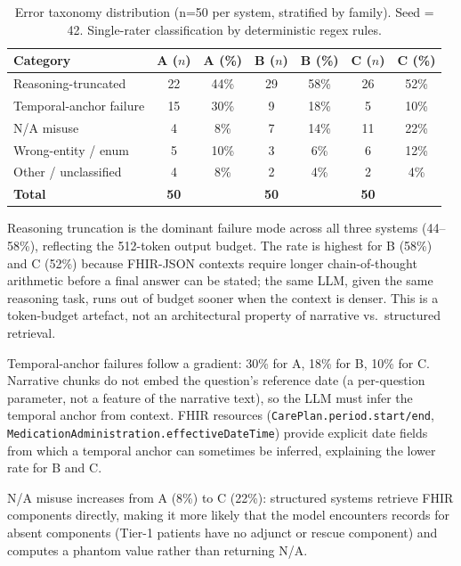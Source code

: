 \begin{table}[!htbp]
\centering
\caption{Error taxonomy distribution (n=50 per system, stratified by family).
Seed = 42. Single-rater classification by deterministic regex rules.}
\label{tab:errors}
\begin{tabular}{lcccccc}
\toprule
Category & A ($n$) & A (\%) & B ($n$) & B (\%) & C ($n$) & C (\%) \\
\midrule
Reasoning-truncated       & 22 & 44\% & 29 & 58\% & 26 & 52\% \\
Temporal-anchor failure   & 15 & 30\% & 9  & 18\% & 5  & 10\% \\
N/A misuse                & 4  & 8\%  & 7  & 14\% & 11 & 22\% \\
Wrong-entity / enum       & 5  & 10\% & 3  & 6\%  & 6  & 12\% \\
Other / unclassified      & 4  & 8\%  & 2  & 4\%  & 2  & 4\%  \\
\midrule
\textbf{Total}            & \textbf{50} & & \textbf{50} & & \textbf{50} & \\
\bottomrule
\end{tabular}
\end{table}

Reasoning truncation is the dominant failure mode across all three systems (44--58\%),
reflecting the 512-token output budget.  The rate is highest for B (58\%) and C (52\%)
because FHIR-JSON contexts require longer chain-of-thought arithmetic before a final answer
can be stated; the same LLM, given the same reasoning task, runs out of budget sooner when
the context is denser.  This is a token-budget artefact, not an architectural property of
narrative vs.\ structured retrieval.

Temporal-anchor failures follow a gradient: 30\% for A, 18\% for B, 10\% for C.
Narrative chunks do not embed the question's reference date (a per-question parameter, not
a feature of the narrative text), so the LLM must infer the temporal anchor from context.
FHIR resources (\texttt{CarePlan.period.start/end}, \texttt{MedicationAdministration.effectiveDateTime})
provide explicit date fields from which a temporal anchor can sometimes be inferred,
explaining the lower rate for B and C.

N/A misuse increases from A (8\%) to C (22\%): structured systems retrieve FHIR components
directly, making it more likely that the model encounters records for absent components
(Tier-1 patients have no adjunct or rescue component) and computes a phantom value rather
than returning N/A.

